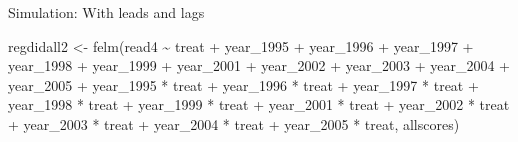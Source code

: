 \documentclass[
  ignorenonframetext,
]{beamer}
\newenvironment{Shaded}{\begin{snugshade}}{\end{snugshade}}
\newcommand{\FunctionTok}[1]{\textcolor[rgb]{0.00,0.00,0.00}{#1}}
\newcommand{\NormalTok}[1]{#1}
\newcommand{\OtherTok}[1]{\textcolor[rgb]{0.56,0.35,0.01}{#1}}
\newcommand{\SpecialCharTok}[1]{\textcolor[rgb]{0.00,0.00,0.00}{#1}}
\begin{document}
\begin{frame}[fragile]{Simulation: With leads and lags}
\begin{Shaded}
\begin{Highlighting}[]
\NormalTok{regdidall2 }\OtherTok{\textless{}{-}} \FunctionTok{felm}\NormalTok{(read4 }\SpecialCharTok{\textasciitilde{}}\NormalTok{ treat }\SpecialCharTok{+}\NormalTok{ year\_1995 }\SpecialCharTok{+}\NormalTok{ year\_1996 }\SpecialCharTok{+}\NormalTok{ year\_1997 }\SpecialCharTok{+}
\NormalTok{    year\_1998 }\SpecialCharTok{+}\NormalTok{ year\_1999 }\SpecialCharTok{+}\NormalTok{ year\_2001 }\SpecialCharTok{+}\NormalTok{ year\_2002 }\SpecialCharTok{+}\NormalTok{ year\_2003 }\SpecialCharTok{+}
\NormalTok{    year\_2004 }\SpecialCharTok{+}\NormalTok{ year\_2005 }\SpecialCharTok{+}\NormalTok{ year\_1995 }\SpecialCharTok{*}\NormalTok{ treat }\SpecialCharTok{+}\NormalTok{ year\_1996 }\SpecialCharTok{*}\NormalTok{ treat }\SpecialCharTok{+}
\NormalTok{    year\_1997 }\SpecialCharTok{*}\NormalTok{ treat }\SpecialCharTok{+}\NormalTok{ year\_1998 }\SpecialCharTok{*}\NormalTok{ treat }\SpecialCharTok{+}\NormalTok{ year\_1999 }\SpecialCharTok{*}\NormalTok{ treat }\SpecialCharTok{+}
\NormalTok{    year\_2001 }\SpecialCharTok{*}\NormalTok{ treat }\SpecialCharTok{+}\NormalTok{ year\_2002 }\SpecialCharTok{*}\NormalTok{ treat }\SpecialCharTok{+}\NormalTok{ year\_2003 }\SpecialCharTok{*}\NormalTok{ treat }\SpecialCharTok{+}
\NormalTok{    year\_2004 }\SpecialCharTok{*}\NormalTok{ treat }\SpecialCharTok{+}\NormalTok{ year\_2005 }\SpecialCharTok{*}\NormalTok{ treat, allscores)}
\end{Highlighting}
\end{Shaded}
\end{frame}
\end{document}
